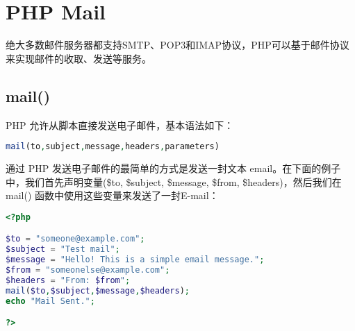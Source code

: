\begin{lstlisting}[language=PHP]

\end{lstlisting}




\begin{lstlisting}[language=PHP]

\end{lstlisting}






\begin{lstlisting}[language=PHP]

\end{lstlisting}





\begin{lstlisting}[language=PHP]

\end{lstlisting}









\chapter{PHP Mail}





绝大多数邮件服务器都支持SMTP、POP3和IMAP协议，PHP可以基于邮件协议来实现邮件的收取、发送等服务。




\section{mail()}


PHP 允许从脚本直接发送电子邮件，基本语法如下：

\begin{lstlisting}[language=PHP]
mail(to,subject,message,headers,parameters)
\end{lstlisting}




通过 PHP 发送电子邮件的最简单的方式是发送一封文本 email。在下面的例子中，我们首先声明变量(\$to, \$subject, \$message, \$from, \$headers)，然后我们在 mail() 函数中使用这些变量来发送了一封E-mail：

\begin{lstlisting}[language=PHP]
<?php

$to = "someone@example.com";
$subject = "Test mail";
$message = "Hello! This is a simple email message.";
$from = "someonelse@example.com";
$headers = "From: $from";
mail($to,$subject,$message,$headers);
echo "Mail Sent.";

?>
\end{lstlisting}


